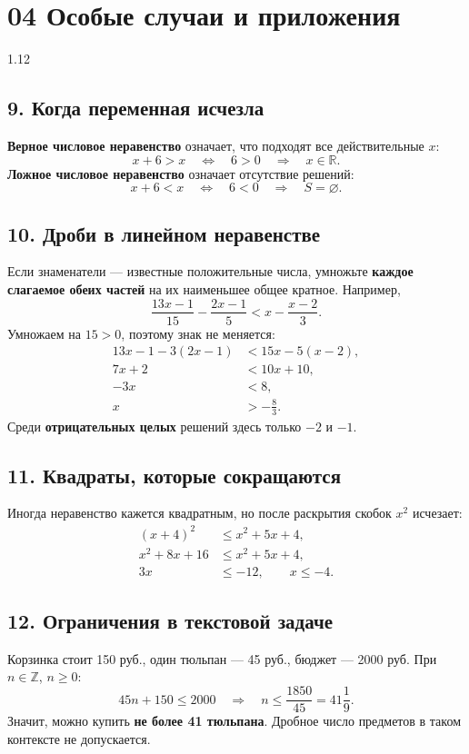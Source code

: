 \documentclass[a4paper,12pt]{article}
\newcommand{\key}[1]{\textbf{\textcolor{darkaccent}{#1}}}
\begin{document}
\section*{04 \quad Особые случаи и приложения}
\begin{spacing}{1.12}
\small
\subsection*{9. Когда переменная исчезла}
\key{Верное числовое неравенство} означает, что подходят все действительные $x$:
\[
x+6>x\quad\Longleftrightarrow\quad6>0
\quad\Longrightarrow\quad x\in\mathbb R.
\]
\key{Ложное числовое неравенство} означает отсутствие решений:
\[
x+6<x\quad\Longleftrightarrow\quad6<0
\quad\Longrightarrow\quad S=\varnothing.
\]

\subsection*{10. Дроби в линейном неравенстве}
Если знаменатели --- известные положительные числа, умножьте \key{каждое слагаемое обеих частей} на их наименьшее общее кратное. Например,
\[
\frac{13x-1}{15}-\frac{2x-1}{5}<x-\frac{x-2}{3}.
\]
Умножаем на $15>0$, поэтому знак не меняется:
\[
\begin{aligned}
13x-1-3(2x-1)&<15x-5(x-2),\\
7x+2&<10x+10,\\
-3x&<8,\\
x&>-\frac83.
\end{aligned}
\]
Среди \key{отрицательных целых} решений здесь только $-2$ и $-1$.

\subsection*{11. Квадраты, которые сокращаются}
Иногда неравенство кажется квадратным, но после раскрытия скобок $x^2$ исчезает:
\[
\begin{aligned}
(x+4)^2&\le x^2+5x+4,\\
x^2+8x+16&\le x^2+5x+4,\\
3x&\le-12,\qquad\boxed{x\le-4}.
\end{aligned}
\]

\subsection*{12. Ограничения в текстовой задаче}
Корзинка стоит 150 руб., один тюльпан --- 45 руб., бюджет --- 2000 руб. При $n\in\mathbb Z$, $n\ge0$:
\[
45n+150\le2000\quad\Longrightarrow\quad
n\le\frac{1850}{45}=41\frac19.
\]
Значит, можно купить \key{не более 41 тюльпана}. Дробное число предметов в таком контексте не допускается.
\end{spacing}
\clearpage
\end{document}

